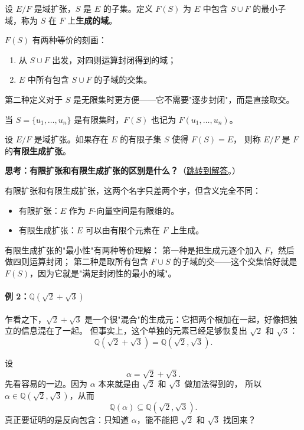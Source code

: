 \begin{definition}[生成域]\label{def:generated-field}
设 $E/F$ 是域扩张，$S$ 是 $E$ 的子集。定义 $F(S)$ 为 $E$ 中包含 $S \cup F$ 的最小子域，称为 $S$ 在 $F$ 上\textbf{生成的域}。

$F(S)$ 有两种等价的刻画：
\begin{enumerate}
    \item 从 $S \cup F$ 出发，对四则运算封闭得到的域；
    \item $E$ 中所有包含 $S \cup F$ 的子域的交集。
\end{enumerate}
第二种定义对于 $S$ 是无限集时更方便——它不需要"逐步封闭"，而是直接取交。

当 $S = \{u_1, \ldots, u_n\}$ 是有限集时，$F(S)$ 也记为 $F(u_1, \ldots, u_n)$。
\end{definition}

\begin{definition}[有限生成扩张]\label{def:finitely-generated-extension}
设 $E/F$ 是域扩张。如果存在 $E$ 的有限子集 $S$ 使得 $F(S) = E$，
则称 $E/F$ 是 $F$ 的\textbf{有限生成扩张}。
\end{definition}

\hypertarget{q:finite-vs-finitely-generated}{}
\medskip
\noindent\textbf{思考：有限扩张和有限生成扩张的区别是什么？}（\hyperlink{ans:finite-vs-finitely-generated}{跳转到解答}。）
\medskip

有限扩张和有限生成扩张，这两个名字只差两个字，但含义完全不同：

\begin{itemize}
    \item 有限扩张：$E$ 作为 $F$-向量空间是有限维的。
    \item 有限生成扩张：$E$ 可以由有限个元素在 $F$ 上生成。
\end{itemize}

有限生成扩张的"最小性"有两种等价理解：
第一种是把生成元逐个加入 $F$，然后做四则运算封闭；
第二种是取所有包含 $F \cup S$ 的子域的交——这个交集恰好就是 $F(S)$，因为它就是"满足封闭性的最小的域"。

\paragraph*{例 2：$\mathbb{Q}(\sqrt{2}+\sqrt{3})$}
乍看之下，$\sqrt{2}+\sqrt{3}$ 是一个很"混合"的生成元：它把两个根加在一起，好像把独立的信息混在了一起。
但事实上，这个单独的元素已经足够恢复出 $\sqrt{2}$ 和 $\sqrt{3}$：
\[
\mathbb{Q}(\sqrt{2}+\sqrt{3}) = \mathbb{Q}(\sqrt{2}, \sqrt{3}).
\]

设
\[
\alpha=\sqrt{2}+\sqrt{3}.
\]
先看容易的一边。因为 $\alpha$ 本来就是由 $\sqrt{2}$ 和 $\sqrt{3}$ 做加法得到的，
所以 $\alpha\in\mathbb{Q}(\sqrt{2},\sqrt{3})$，从而
\[
\mathbb{Q}(\alpha)\subseteq \mathbb{Q}(\sqrt{2},\sqrt{3}).
\]
真正要证明的是反向包含：只知道 $\alpha$，能不能把 $\sqrt{2}$ 和 $\sqrt{3}$ 找回来？

